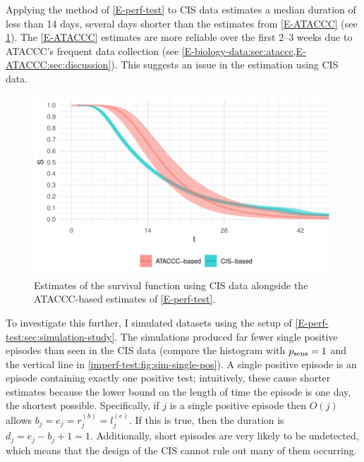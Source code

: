 \documentclass[thesis.tex]{subfiles}
\begin{document}
Applying the method of \cref{E-perf-test} to CIS data estimates a median duration of less than 14 days, several days shorter than the estimates from \cref{E-ATACCC} (see \cref{imperf-test:fig:problem-cis-estimates}).
The \cref{E-ATACCC} estimates are more reliable over the first 2--3 weeks due to ATACCC's frequent data collection (see \cref{E-biology-data:sec:ataccc,E-ATACCC:sec:discussion}).
This suggests an issue in the estimation using CIS data.
\begin{figure}
  \centering \includegraphics{cis-imperfect-testing/CIS_perfect}
  \caption[Estimating survival using CIS data assuming perfect testing]{Estimates of the survival function using CIS data alongside the ATACCC-based estimates of \cref{E-perf-test}. \label{imperf-test:fig:problem-cis-estimates}}
\end{figure}

To investigate this further, I simulated  datasets using the setup of \cref{E-perf-test:sec:simulation-study}.
The simulations produced far fewer single positive episodes than seen in the CIS data (compare the histogram with $p_\text{sens}=1$ and the vertical line in \cref{imperf-test:fig:sim-single-pos}).
A single positive episode is an episode containing exactly one positive test; intuitively, these cause shorter estimates because the lower bound on the length of time the episode is one day, the shortest possible.
Specifically, if $j$ is a single positive episode then $O(j)$ allows $b_j = e_j = r_j^{(b)} = l_j^{(e)}$.
If this is true, then the duration is $d_j = e_j - b_j + 1 = 1$.
Additionally, short episodes are very likely to be undetected, which means that the design of the CIS cannot rule out many of them occurring.
\end{document}
